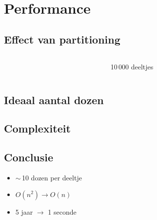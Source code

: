 \documentclass{beamer}
\newcommand{\includeGraph}[2]{
	\begin{center}
	\scalebox{#1}{
		
	}
	\end{center}
}
\begin{document}
\section{Performance}
\subsection{Effect van partitioning}
\begin{frame}
\begin{columns}
\begin{column}{0.85\textwidth}
\includeGraph{0.75}{fixedPartnum}
\end{column}
\begin{column}{0.15\textwidth}
10\,000 deeltjes
\end{column}
\end{columns}
\end{frame}

\subsection{Ideaal aantal dozen}
\begin{frame}
\includeGraph{0.8}{idealNboxR0p5}
\end{frame}

\begin{frame}
\includeGraph{0.8}{idealNboxR0p1-1M}
\end{frame}

\subsection{Complexiteit}
\begin{frame}
\includeGraph{0.8}{linearComplexityR0p5}
\end{frame}

\begin{frame}
\includeGraph{0.8}{linearComplexityR0p1-1M}
\end{frame}

\subsection{Conclusie}
\begin{frame}
\begin{itemize}
\item $\sim$\,10 dozen per deeltje
\item $O(n^2) \rightarrow O(n)$
\item 5 jaar $\rightarrow$ 1 seconde
\end{itemize}
\end{frame}
\end{document}
